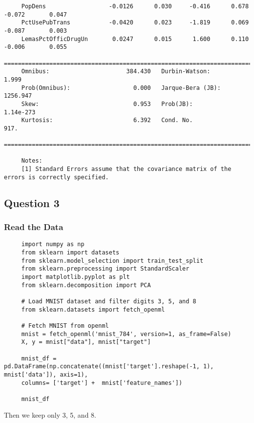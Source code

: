\documentclass[letterpaper]{article}
\begin{document}
\begin{minipage}{\linewidth}
\begin{Verbatim}
     PopDens                  -0.0126      0.030     -0.416      0.678      -0.072       0.047
     PctUsePubTrans           -0.0420      0.023     -1.819      0.069      -0.087       0.003
     LemasPctOfficDrugUn       0.0247      0.015      1.600      0.110      -0.006       0.055
     ==============================================================================
     Omnibus:                      384.430   Durbin-Watson:                   1.999
     Prob(Omnibus):                  0.000   Jarque-Bera (JB):             1256.947
     Skew:                           0.953   Prob(JB):                    1.14e-273
     Kurtosis:                       6.392   Cond. No.                         917.
     ==============================================================================
     
     Notes:
     [1] Standard Errors assume that the covariance matrix of the errors is correctly specified.
	\end{Verbatim}
\end{minipage}

\subsection{Question 3}
\subsubsection{Read the Data}
\begin{lstlisting}
     import numpy as np
     from sklearn import datasets
     from sklearn.model_selection import train_test_split
     from sklearn.preprocessing import StandardScaler
     import matplotlib.pyplot as plt
     from sklearn.decomposition import PCA
     
     # Load MNIST dataset and filter digits 3, 5, and 8
     from sklearn.datasets import fetch_openml
     
     # Fetch MNIST from openml
     mnist = fetch_openml('mnist_784', version=1, as_frame=False)
     X, y = mnist["data"], mnist["target"]
     
     mnist_df = pd.DataFrame(np.concatenate((mnist['target'].reshape(-1, 1), mnist['data']), axis=1), 
     columns= ['target'] +  mnist['feature_names'])
     
     mnist_df
\end{lstlisting}
		
		Then we keep only 3, 5, and 8.
		
\end{document}
